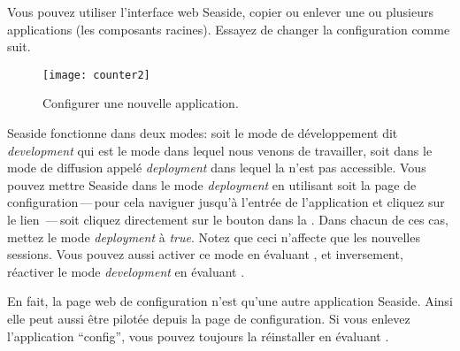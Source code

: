 \documentclass[a4paper,10pt,twoside]{book}
\begin{document}
Vous pouvez utiliser l'interface web Seaside, copier ou enlever une
ou plusieurs applications (\ie les composants racines). Essayez de
changer la configuration comme suit.



\begin{figure}[ht]
\begin{center}
\texttt{[image: counter2]}
\caption{Configurer une nouvelle application.}
\end{center}
\end{figure}

Seaside fonctionne dans deux modes: soit le mode de développement dit 
\emph{development} qui est le mode dans lequel nous venons de travailler,
soit dans le mode de diffusion appelé \emph{deployment} dans lequel la
\toolbar n'est pas accessible. 
Vous pouvez mettre Seaside dans le mode \emph{deployment} en utilisant
soit la page de configuration\,---\,pour cela naviguer jusqu'à
l'entrée de l'application et cliquez sur le lien \,---\,soit
cliquez directement sur le bouton   dans la
\toolbar.
Dans chacun de ces cas, mettez le mode \emph{deployment} à
\emph{true}.
Notez que ceci n'affecte que les nouvelles sessions.
Vous pouvez aussi activer ce mode en évaluant 
 , et
inversement, réactiver le mode \emph{development} en évaluant
.

En fait, la page web de configuration n'est qu'une autre application
Seaside. Ainsi elle peut aussi être pilotée depuis la page de
configuration. Si vous enlevez l'application
``config'', vous pouvez toujours la réinstaller en évaluant
 .
\end{document}
